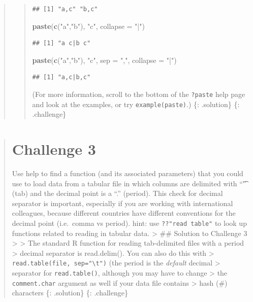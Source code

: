 \documentclass[]{book}
\newenvironment{Shaded}{\begin{snugshade}}{\end{snugshade}}
\newcommand{\KeywordTok}[1]{\textcolor[rgb]{0.13,0.29,0.53}{\textbf{#1}}}
\newcommand{\DataTypeTok}[1]{\textcolor[rgb]{0.13,0.29,0.53}{#1}}
\newcommand{\StringTok}[1]{\textcolor[rgb]{0.31,0.60,0.02}{#1}}
\newcommand{\NormalTok}[1]{#1}
\begin{document}
\begin{quote}
\begin{quote}
\begin{verbatim}
## [1] "a,c" "b,c"
\end{verbatim}

\begin{Shaded}
\begin{Highlighting}[]
\KeywordTok{paste}\NormalTok{(}\KeywordTok{c}\NormalTok{(}\StringTok{"a"}\NormalTok{,}\StringTok{"b"}\NormalTok{), }\StringTok{"c"}\NormalTok{, }\DataTypeTok{collapse =} \StringTok{"|"}\NormalTok{)}
\end{Highlighting}
\end{Shaded}

\begin{verbatim}
## [1] "a c|b c"
\end{verbatim}

\begin{Shaded}
\begin{Highlighting}[]
\KeywordTok{paste}\NormalTok{(}\KeywordTok{c}\NormalTok{(}\StringTok{"a"}\NormalTok{,}\StringTok{"b"}\NormalTok{), }\StringTok{"c"}\NormalTok{, }\DataTypeTok{sep =} \StringTok{","}\NormalTok{, }\DataTypeTok{collapse =} \StringTok{"|"}\NormalTok{)}
\end{Highlighting}
\end{Shaded}

\begin{verbatim}
## [1] "a,c|b,c"
\end{verbatim}

(For more information, scroll to the bottom of the \texttt{?paste} help
page and look at the examples, or try
\texttt{example(\textquotesingle{}paste\textquotesingle{})}.) \{:
.solution\} \{: .challenge\}
\end{quote}
\end{quote}

\begin{quote}
\section{Challenge 3}\label{challenge-3}

Use help to find a function (and its associated parameters) that you
could use to load data from a tabular file in which columns are
delimited with ``\t'' (tab) and the decimal point is a ``.'' (period).
This check for decimal separator is important, especially if you are
working with international colleagues, because different countries have
different conventions for the decimal point (i.e.~comma vs period).
hint: use \texttt{??"read\ table"} to look up functions related to
reading in tabular data. \textgreater{} \#\# Solution to Challenge 3
\textgreater{} \textgreater{} The standard R function for reading
tab-delimited files with a period \textgreater{} decimal separator is
read.delim(). You can also do this with \textgreater{}
\texttt{read.table(file,\ sep="\textbackslash{}t")} (the period is the
\emph{default} decimal \textgreater{} separator for
\texttt{read.table()}, although you may have to change \textgreater{}
the \texttt{comment.char} argument as well if your data file contains
\textgreater{} hash (\#) characters \{: .solution\} \{: .challenge\}
\end{quote}
\end{document}
